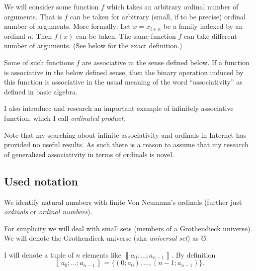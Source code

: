 We will consider some function $f$ which takes an arbitrary ordinal
number of arguments. That is $f$ can be taken for arbitrary (small,
if to be precise) ordinal number of arguments. More formally: Let
$x=x_{i\in n}$ be a family indexed by an ordinal $n$. Then $f(x)$
can be taken. The same function $f$ can take different number of
arguments. (See below for the exact definition.)

Some of such functions $f$ are associative in the sense defined below.
If a function is associative in the below defined sense, then the
binary operation induced by this function is associative in the usual
meaning of the word ``associativity'' as defined in basic algebra.

I also introduce and research an important example of infinitely associative
function, which I call \emph{ordinated product}.

Note that my searching about infinite associativity and ordinals in
Internet has provided no useful results. As such there is a reason
to assume that my research of generalized associativity in terms of
ordinals is novel.


\subsection{Used notation}

We identify natural numbers with finite Von Neumann's
ordinals (further just \emph{ordinals} or \emph{ordinal numbers}).

For simplicity we will deal with small sets (members of a Grothendieck
universe). We will denote the Grothendieck universe (aka \emph{universal
set}) as $\mho$.

I will denote a tuple of $n$ elements like $\left\llbracket a_{0};\ldots;a_{n-1}\right\rrbracket $.
By definition
\[
\left\llbracket a_{0};\ldots;a_{n-1}\right\rrbracket =\{(0;a_{0}),\ldots,(n-1;a_{n-1})\}.
\]


